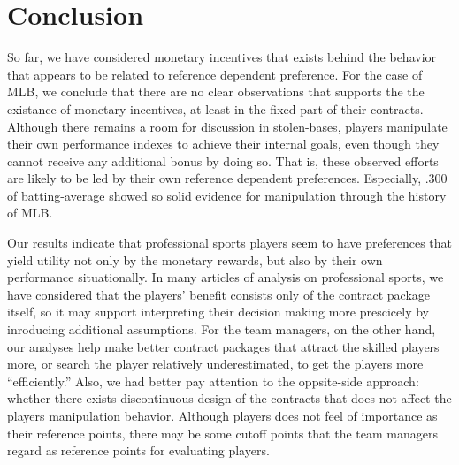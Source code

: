 \documentclass[dvipdfmx, 12pt]{article}
\begin{document}
\begin{landscape}
  \begin{table}
    
  \end{table}
\end{landscape}

\begin{landscape}
  \begin{table}
    
  \end{table}
\end{landscape}


\section{Conclusion}


So far, we have considered monetary incentives that exists behind the behavior that appears to be related to reference dependent preference. For the case of MLB, we conclude that there are no clear observations that supports the the existance of monetary incentives, at least in the fixed part of their contracts. Although there remains a room for discussion in stolen-bases, players manipulate their own performance indexes to achieve their internal goals, even though they cannot receive any additional bonus by doing so. That is, these observed efforts are likely to be led by their own reference dependent preferences. Especially, .300 of batting-average showed so solid evidence for manipulation through the history of MLB.

Our results indicate that professional sports players seem to have preferences that yield utility not only by the monetary rewards, but also by their own performance situationally. In many articles of analysis on professional sports, we have considered that the players' benefit consists only of the contract package itself, so it may support interpreting their decision making more prescicely by inroducing additional assumptions. For the team managers, on the other hand, our analyses help make better contract packages that attract the skilled players more, or search the player relatively underestimated, to get the players more ``efficiently.'' Also, we had better pay attention to the oppsite-side approach: whether there exists discontinuous design of the contracts that does not affect the players manipulation behavior. Although players does not feel of importance as their reference points, there may be some cutoff points that the team managers regard as reference points for evaluating players.
\end{document}

